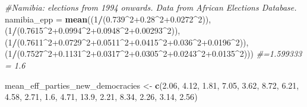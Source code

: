 \documentclass[11pt, oneside]{article}   	%
\newenvironment{Shaded}{\begin{snugshade}}{\end{snugshade}}
\newcommand{\CommentTok}[1]{\textcolor[rgb]{0.56,0.35,0.01}{\textit{#1}}}
\newcommand{\DecValTok}[1]{\textcolor[rgb]{0.00,0.00,0.81}{#1}}
\newcommand{\FloatTok}[1]{\textcolor[rgb]{0.00,0.00,0.81}{#1}}
\newcommand{\KeywordTok}[1]{\textcolor[rgb]{0.13,0.29,0.53}{\textbf{#1}}}
\newcommand{\NormalTok}[1]{#1}
\newcommand{\OperatorTok}[1]{\textcolor[rgb]{0.81,0.36,0.00}{\textbf{#1}}}
\newcommand{\StringTok}[1]{\textcolor[rgb]{0.31,0.60,0.02}{#1}}
\begin{document}
\begin{Shaded}
\begin{Highlighting}[]
{{{\CommentTok{#Namibia: elections from 1994 onwards. Data from African Elections Database.}
\NormalTok{namibia_epp =}\StringTok{ }\KeywordTok{mean}\NormalTok{((}\DecValTok{1}\OperatorTok{/}\NormalTok{(}\FloatTok{0.739}\OperatorTok{^}\DecValTok{2}\FloatTok{+0.28}\OperatorTok{^}\DecValTok{2}\FloatTok{+0.0272}\OperatorTok{^}\DecValTok{2}\NormalTok{)), (}\DecValTok{1}\OperatorTok{/}\NormalTok{(}\FloatTok{0.7615}\OperatorTok{^}\DecValTok{2}\FloatTok{+0.0994}\OperatorTok{^}\DecValTok{2}\FloatTok{+0.0948}\OperatorTok{^}\DecValTok{2}\FloatTok{+0.00293}\OperatorTok{^}\DecValTok{2}\NormalTok{)),}
\NormalTok{                   (}\DecValTok{1}\OperatorTok{/}\NormalTok{(}\FloatTok{0.7611}\OperatorTok{^}\DecValTok{2}\FloatTok{+0.0729}\OperatorTok{^}\DecValTok{2}\FloatTok{+0.0511}\OperatorTok{^}\DecValTok{2}\FloatTok{+0.0415}\OperatorTok{^}\DecValTok{2}\FloatTok{+0.036}\OperatorTok{^}\DecValTok{2}\FloatTok{+0.0196}\OperatorTok{^}\DecValTok{2}\NormalTok{)),}
\NormalTok{                   (}\DecValTok{1}\OperatorTok{/}\NormalTok{(}\FloatTok{0.7527}\OperatorTok{^}\DecValTok{2}\FloatTok{+0.1131}\OperatorTok{^}\DecValTok{2}\FloatTok{+0.0317}\OperatorTok{^}\DecValTok{2}\FloatTok{+0.0305}\OperatorTok{^}\DecValTok{2}\FloatTok{+0.0243}\OperatorTok{^}\DecValTok{2}\FloatTok{+0.0135}\OperatorTok{^}\DecValTok{2}\NormalTok{)))}
\CommentTok{#=1.599333 = 1.6}

\NormalTok{mean_eff_parties_new_democracies <-}\StringTok{ }\KeywordTok{c}\NormalTok{(}\FloatTok{2.06}\NormalTok{, }\FloatTok{4.12}\NormalTok{, }\FloatTok{1.81}\NormalTok{, }\FloatTok{7.05}\NormalTok{, }\FloatTok{3.62}\NormalTok{, }\FloatTok{8.72}\NormalTok{, }\FloatTok{6.21}\NormalTok{, }\FloatTok{4.58}\NormalTok{,}
                                      \FloatTok{2.71}\NormalTok{, }\FloatTok{1.6}\NormalTok{, }\FloatTok{4.71}\NormalTok{, }\FloatTok{13.9}\NormalTok{, }\FloatTok{2.21}\NormalTok{, }\FloatTok{8.34}\NormalTok{, }\FloatTok{2.26}\NormalTok{, }\FloatTok{3.14}\NormalTok{, }\FloatTok{2.56}\NormalTok{)}

}}}
\end{Highlighting}
\end{Shaded}
\end{document}
